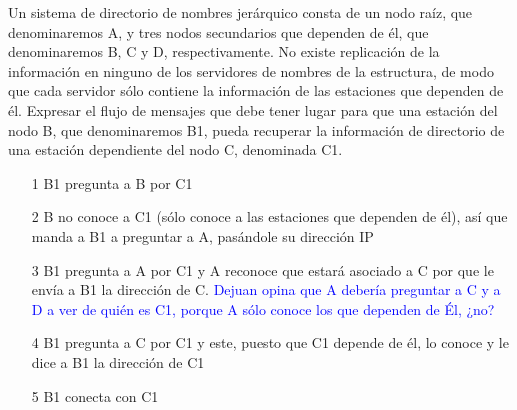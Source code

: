   \begin{problem}[10]
  Un sistema de directorio de nombres jerárquico consta de un nodo raíz, que
denominaremos A, y tres nodos secundarios que dependen de él, que denominaremos
B, C y D, respectivamente. No existe replicación de la información en ninguno
de los servidores de nombres de la estructura, de modo que cada servidor sólo
contiene la información de las estaciones que dependen de él. Expresar el flujo
de mensajes que debe tener lugar para que una estación del nodo B, que
denominaremos B1, pueda recuperar la información de directorio de una estación
dependiente del nodo C, denominada C1.
  \solution

  \yoP

  \begin{enumerate}
  \item[1] B1 pregunta a B por C1
  \item[2] B no conoce a C1 (sólo conoce a las estaciones que dependen de él), así que manda a B1 a preguntar a A, pasándole su dirección IP
  \item[3] B1 pregunta a A por C1 y A reconoce que estará asociado a C por que le envía a B1 la dirección de C. \textcolor{blue}{Dejuan opina que A debería preguntar a C y a D a ver de quién es C1, porque A sólo conoce los que dependen de Él, ¿no?}
  \item[4] B1 pregunta a C por C1 y este, puesto que C1 depende de él, lo conoce y le dice a B1 la dirección de C1
  \item[5] B1 conecta con C1
  \end{enumerate}

  \end{problem}

